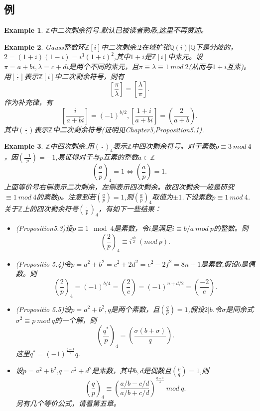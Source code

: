 \documentclass[UTF8]{article}
\newtheorem{exa}{Example}[section]
\begin{document}
\subsection{例}
\begin{exa}
	$\mathbb{Z}$中二次剩余符号.默认已被读者熟悉,这里不再赘述。
\end{exa}
\begin{exa}
	Gauss整数环$\mathbb{Z}[i]$中二次剩余.$2$在域扩张$\mathbb{Q}(i)|\mathbb{Q}$下是分歧的，$2=(1+i)(1-i)=i^{3}(1+i)^{2}$,其中$1+i$是$\mathbb{Z}[i]$中素元。设$\pi=a+bi,\lambda=c+di$是两个不同的素元，且$\pi\equiv \lambda\equiv 1\ mod \ 2$(从而与$1+i$互素)。用$\left[\frac{\cdot}{\cdot}\right]$表示$\mathbb{Z}[i]$中二次剩余符号，则有
	$$\left[\frac{\pi}{\lambda}\right]=\left[\frac{\lambda}{\pi}\right].$$
	作为补充律，有
	$$\left[\frac{i}{a+bi}\right]=(-1)^{b/2},\left[\frac{1+i}{a+bi}\right]=\left(\frac{2}{a+b}\right).$$
	其中$\left(\frac{\cdot}{\cdot}\right)$表示$\mathbb{Z}$中二次剩余符号(证明见\cite{lemmer}Chapter5,Proposition5.1).
\end{exa}
\begin{exa}
	$\mathbb{Z}$中四次剩余.用$\left(\frac{\cdot}{\cdot}\right)_{4}$表示$\mathbb{Z}$中四次剩余符号。对于素数$p\equiv 3\ mod \ 4$，因$\left(\frac{-1}{p}\right)=-1$,易证得对于与$p$互素的整数$a\in\mathbb{Z}$
	$$
	\left(\frac{a}{p}\right)_{4}=1\Leftrightarrow \left(\frac{a}{p}\right)=1.
	$$
	上面等价号右侧表示二次剩余，左侧表示四次剩余。故四次剩余一般是研究$\equiv 1\ mod \ 4$的素数$p$。注意到若$\left(\frac{a}{p}\right)=1$,则$\left(\frac{a}{p}\right)_{4}$取值为$\pm 1$.下设素数$p\equiv 1 \ mod \ 4$.
	关于$\mathbb{Z}$上的四次剩余符号$\left(\frac{\cdot}{p}\right)_{4}$，有如下一些结果：
	\begin{itemize}
		\item (\cite{lemmer}Proposition5.3)设$p\equiv 1\mod 4$是素数，令$i$是满足$i\equiv b/a\ mod\ p$的整数。则$$
	\left(\frac{2}{p}\right)_{4}\equiv i^{\frac{ab}{2}}\ (mod\ p).
		$$
		\item (\cite{lemmer}Propositio 5.4)令$p=a^{2}+b^{2}=c^{2}+2d^{2}=e^{2}-2f^{2}=8n+1$是素数,假设$b$是偶数。则
		$$
		\left(\frac{2}{p}\right)_{4}=(-1)^{b/4}=\left(\frac{2}{c}\right)=(-1)^{n+d/2}=\left(\frac{-2}{e}\right).
		$$
		\item (\cite{lemmer}Propositio 5.5)设$p=a^{2}+b^{2},q$是两个素数，且$\left(\frac{q}{p}\right)=1$,假设$2|b$.令$\sigma$是同余式$\sigma^{2}\equiv p \ mod \ q$的一个解，则
		$$
		\left(\frac{q^{*}}{p}\right)_{4}=\left(\frac{\sigma(b+\sigma)}{q}\right).
		$$
		这里$q^{*}=(-1)^{\frac{q-1}{2}}q.$
		\item 设$p=a^{2}+b^{2}$,$q=c^{2}+d^{2}$是素数，其中$b,d$是偶数且$\left(\frac{p}{q}\right)=1$,则
		$$
		\left(\frac{q}{p}\right)_{4}\equiv \left(\frac{a/b-c/d}{a/b+c/d}\right)^{\frac{q-1}{4}} \ mod \ q.
		$$
		另有几个等价公式，请看\cite{lemmer}第五章。
	\end{itemize}

	
\end{exa}
\end{document}
